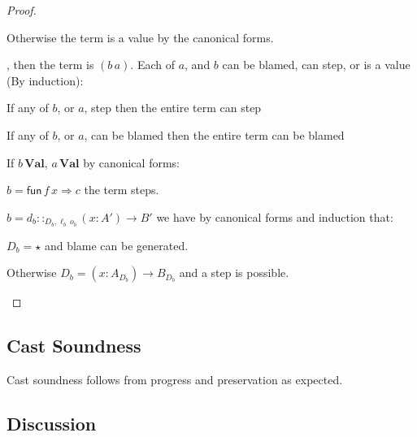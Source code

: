 \begin{proof}
\begin{casenv}
\begin{casenv}
\begin{casenv}
     \item Otherwise the term is a value by the canonical forms.
   \end{casenv}
 \end{casenv}
 \item {}, then the term is $(b\,a)$.
  Each of $a$, and $b$ can be blamed, can step, or is a value (By induction):
  \begin{casenv}
    \item If any of $b$, or $a$, step then the entire term can step
    \item If any of $b$, or $a$, can be blamed then the entire term can be blamed
    \item If $b\,\textbf{Val}$, $a\,\textbf{Val}$ by canonical forms:
    \begin{casenv}
      \item $b=\mathsf{fun}\,f\,x\Rightarrow c$ the term steps.
      \item $b=d_{b}::_{D_{b},\ell _{b}\,o_{b}}\left(x:A'\right)\rightarrow B'$ we have by canonical forms and induction that:
      \begin{casenv}
        \item $D_{b}=\star$ and blame can be generated.
        \item Otherwise $D_{b}=\left(x:A_{D_{b}}\right)\rightarrow B_{D_{b}}$ and a step is possible.
      \end{casenv}
    \end{casenv}
  \end{casenv}
\end{casenv}
\end{proof}
 
\subsection{Cast Soundness}
 
 
Cast soundness follows from progress and preservation as expected.
 
 
\subsection{Discussion}
 
